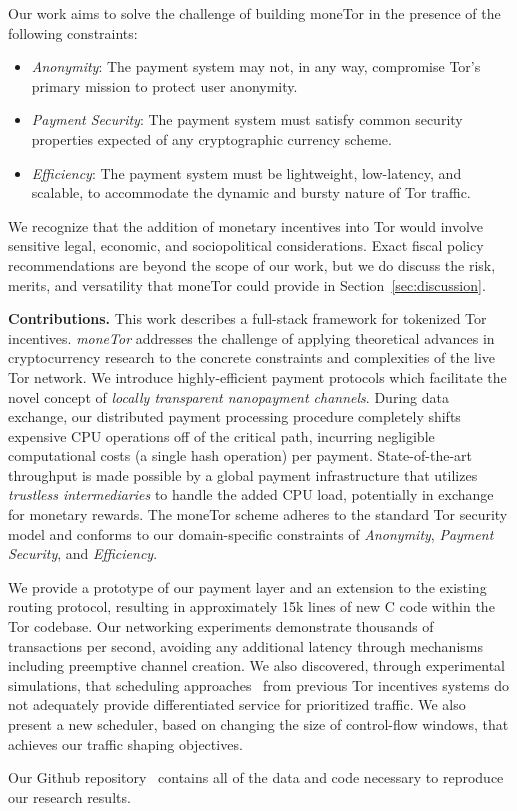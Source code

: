 Our work aims to solve the challenge of building moneTor in the presence of the following constraints:

\begin{itemize}

\item \emph{Anonymity}: The payment system may not, in any way, compromise Tor's primary mission to protect user anonymity.

\item \emph{Payment Security}: The payment system must satisfy common security properties expected of any cryptographic currency scheme.

\item \emph{Efficiency}: The payment system must be lightweight, low-latency, and scalable, to accommodate the
dynamic and bursty nature of Tor traffic.


\end{itemize}

We recognize that the addition of monetary incentives into Tor would involve sensitive legal, economic, and sociopolitical considerations.  Exact fiscal policy recommendations are beyond the scope of our work, but we do discuss the risk, merits, and versatility that moneTor could provide in Section~\ref{sec:discussion}.

\label{sec:Contributions} \medskip \noindent \textbf{Contributions.}  This work describes a full-stack framework for tokenized Tor incentives. \emph{moneTor} addresses the challenge of applying theoretical advances in cryptocurrency research to the concrete constraints and complexities of the live Tor network. We introduce highly-efficient payment protocols which facilitate the novel concept of \emph{locally transparent nanopayment channels}.  During data exchange, our distributed payment processing procedure completely shifts expensive CPU operations off of the critical path, incurring negligible computational costs (a single hash operation) per payment.  State-of-the-art throughput is made possible by a global payment infrastructure that utilizes \emph{trustless intermediaries} to handle the added CPU load, potentially in exchange for monetary rewards.  The moneTor scheme adheres to the standard Tor security model and conforms to our domain-specific constraints of \emph{Anonymity}, \emph{Payment Security}, and \emph{Efficiency}.

We provide a prototype of our payment layer and an extension to the existing routing protocol, resulting in approximately 15k lines of new C code within the Tor codebase.  Our networking experiments demonstrate thousands of transactions per second, avoiding any additional latency through mechanisms including preemptive channel creation. We also discovered, through experimental simulations, that scheduling approaches~\cite{dovrolis1999case, tang2010improved} from previous Tor incentives systems do not adequately provide differentiated service for prioritized traffic. We also present a new scheduler, based on changing the size of control-flow windows, that achieves our traffic shaping objectives.

Our Github repository~\cite{monetor-github} contains all of the data and code necessary to reproduce our research results.

